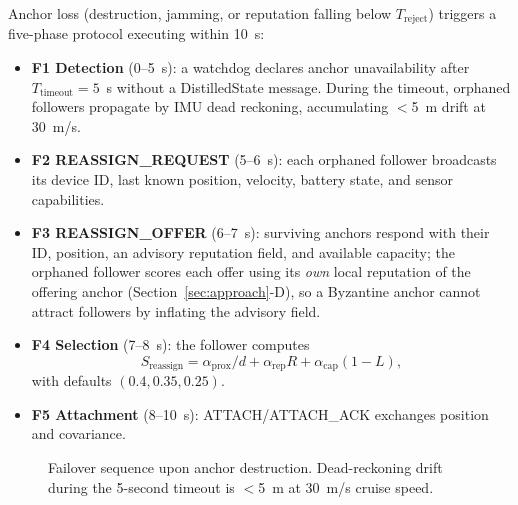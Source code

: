 \documentclass[journal,10pt,twocolumn]{IEEEtran}
\begin{document}
Anchor loss (destruction, jamming, or reputation falling below $T_\text{reject}$) triggers a five-phase protocol executing within 10~s:
\begin{itemize}
    \item \textbf{F1 Detection} (0--5~s): a watchdog declares anchor unavailability after $T_\text{timeout} = 5$~s without a DistilledState message. During the timeout, orphaned followers propagate by IMU dead reckoning, accumulating $<$5~m drift at 30~m/s.
    \item \textbf{F2 REASSIGN\_REQUEST} (5--6~s): each orphaned follower broadcasts its device ID, last known position, velocity, battery state, and sensor capabilities.
    \item \textbf{F3 REASSIGN\_OFFER} (6--7~s): surviving anchors respond with their ID, position, an advisory reputation field, and available capacity; the orphaned follower scores each offer using its \emph{own} local reputation of the offering anchor (Section~\ref{sec:approach}-D), so a Byzantine anchor cannot attract followers by inflating the advisory field.
    \item \textbf{F4 Selection} (7--8~s): the follower computes
    \begin{equation}
    S_\text{reassign} = \alpha_\text{prox}/d + \alpha_\text{rep} R + \alpha_\text{cap}(1 - L),
    \label{eq:reassign}
    \end{equation}
    with defaults $(0.4, 0.35, 0.25)$.
    \item \textbf{F5 Attachment} (8--10~s): ATTACH/ATTACH\_ACK exchanges position and covariance.
\end{itemize}
\begin{figure}[t]
\centering
{}
\caption{Failover sequence upon anchor destruction. Dead-reckoning drift during the 5-second timeout is $<$5~m at 30~m/s cruise speed.}
\label{fig:failover}
\end{figure}
\end{document}
